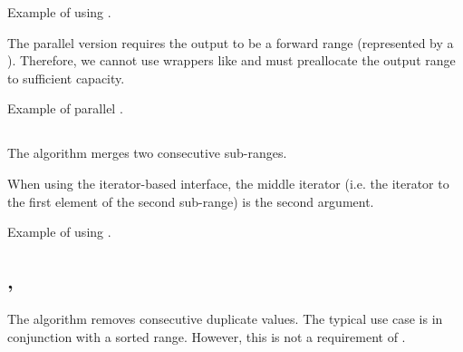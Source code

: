 \begin{codebox}[]{\href{https://compiler-explorer.com/z/fj3rzovKf}{\ExternalLink}}
\footnotesize Example of using .
\tcblower
{}
\end{codebox}

The parallel version requires the output to be a forward range (represented by a ). Therefore, we cannot use wrappers like  and must preallocate the output range to sufficient capacity.

\begin{codebox}[]{\href{https://compiler-explorer.com/z/oEPTe7GnY}{\ExternalLink}}
\footnotesize Example of parallel .
\tcblower
{}
\end{codebox}

\subsection{\texorpdfstring{}{\texttt{std::inplace\_merge}}}

The  algorithm merges two consecutive sub-ranges.


When using the iterator-based interface, the middle iterator (i.e. the iterator to the first element of the second sub-range) is the second argument.

\begin{codebox}[]{\href{https://compiler-explorer.com/z/8Ge81Gojr}{\ExternalLink}}
\footnotesize Example of using .
\tcblower
{}
\end{codebox}

\subsection{\texorpdfstring{, }{\texttt{std::unique}, \texttt{std::unique\_copy}}}

The  algorithm removes consecutive duplicate values. The typical use case is in conjunction with a sorted range. However, this is not a requirement of .

